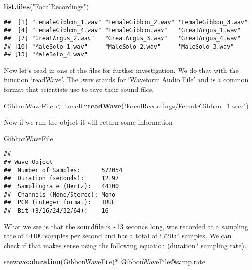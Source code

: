 \documentclass[]{book}
\newenvironment{Shaded}{\begin{snugshade}}{\end{snugshade}}
\newcommand{\KeywordTok}[1]{\textcolor[rgb]{0.13,0.29,0.53}{\textbf{#1}}}
\newcommand{\NormalTok}[1]{#1}
\newcommand{\OperatorTok}[1]{\textcolor[rgb]{0.81,0.36,0.00}{\textbf{#1}}}
\newcommand{\StringTok}[1]{\textcolor[rgb]{0.31,0.60,0.02}{#1}}
\begin{document}
\begin{Shaded}
\begin{Highlighting}[]
\KeywordTok{list.files}\NormalTok{(}\StringTok{"FocalRecordings"}\NormalTok{)}
\end{Highlighting}
\end{Shaded}

\begin{verbatim}
##  [1] "FemaleGibbon_1.wav" "FemaleGibbon_2.wav" "FemaleGibbon_3.wav"
##  [4] "FemaleGibbon_4.wav" "FemaleGibbon.wav"   "GreatArgus_1.wav"  
##  [7] "GreatArgus_2.wav"   "GreatArgus_3.wav"   "GreatArgus_4.wav"  
## [10] "MaleSolo_1.wav"     "MaleSolo_2.wav"     "MaleSolo_3.wav"    
## [13] "MaleSolo_4.wav"
\end{verbatim}

Now let's read in one of the files for further investigation. We do that with the function `readWave'. The .wav stands for `Waveform Audio File' and is a common format that scientists use to save their sound files.

\begin{Shaded}
\begin{Highlighting}[]
\NormalTok{GibbonWaveFile <-}\StringTok{ }\NormalTok{tuneR}\OperatorTok{::}\KeywordTok{readWave}\NormalTok{(}\StringTok{"FocalRecordings/FemaleGibbon_1.wav"}\NormalTok{)}
\end{Highlighting}
\end{Shaded}

Now if we run the object it will return some information

\begin{Shaded}
\begin{Highlighting}[]
\NormalTok{GibbonWaveFile}
\end{Highlighting}
\end{Shaded}

\begin{verbatim}
## 
## Wave Object
##  Number of Samples:      572054
##  Duration (seconds):     12.97
##  Samplingrate (Hertz):   44100
##  Channels (Mono/Stereo): Mono
##  PCM (integer format):   TRUE
##  Bit (8/16/24/32/64):    16
\end{verbatim}

What we see is that the soundfile is \textasciitilde{}13 seconds long, was recorded at a sampling rate of 44100 samples per second and has a total of 572054 samples. We can check if that makes sense using the following equation (duration* sampling rate).

\begin{Shaded}
\begin{Highlighting}[]
\NormalTok{seewave}\OperatorTok{::}\KeywordTok{duration}\NormalTok{(GibbonWaveFile)}\OperatorTok{*}\StringTok{ }\NormalTok{GibbonWaveFile}\OperatorTok{@}\NormalTok{samp.rate}
\end{Highlighting}
\end{Shaded}
\end{document}
